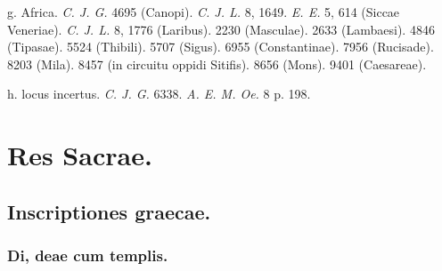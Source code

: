\documentclass[a4paper, 11pt, oneside, polutonikogreek, german, twocolumn]{article}
\begin{document}
g. Africa. \emph{C. J. G.} 4695 (Canopi). \emph{C. J. L.} 8, 1649. \emph{E. E.} 5, 614 (Siccae Veneriae). \emph{C. J. L.} 8, 1776 (Laribus). 2230 (Masculae). 2633 (Lambaesi). 4846 (Tipasae). 5524 (Thibili). 5707 (Sigus). 6955 (Constantinae). 7956 (Rucisade). 8203 (Mila). 8457 (in circuitu oppidi Sitifis). 8656 (Mons). 9401 (Caesareae).

h. locus incertus. \emph{C. J. G.} 6338. \emph{A. E. M. Oe.} 8 p. 198.
\clearpage
\section{Res Sacrae.}
\subsection{Inscriptiones graecae.}
\subsubsection{Di, deae cum templis.}
\end{document}

